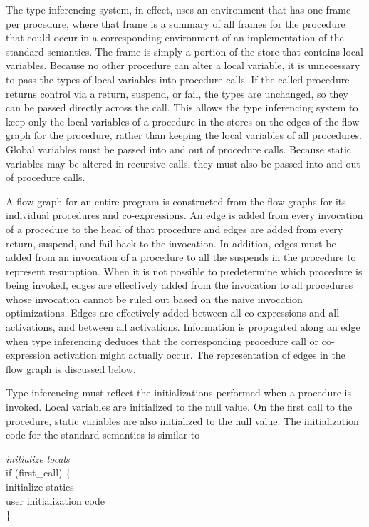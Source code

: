 The type inferencing system, in effect, uses an environment that has
one frame per procedure, where that frame is a summary of all frames
for the procedure that could occur in a corresponding environment of
an implementation of the standard semantics. The frame is simply a
portion of the store that contains local variables. Because no other
procedure can alter a local variable, it is unnecessary to pass the
types of local variables into procedure calls. If the called procedure
returns control via a return, suspend, or fail, the types are
unchanged, so they can be passed directly across the call. This allows
the type inferencing system to keep only the local variables of a
procedure in the stores on the edges of the flow graph for the
procedure, rather than keeping the local variables of all procedures.
Global variables must be passed into and out of procedure
calls. Because static variables may be altered in recursive calls,
they must also be passed into and out of procedure calls.

A flow graph for an entire program is constructed from the flow graphs
for its individual procedures and co-expressions.  An edge is added
from every invocation of a procedure to the head of that procedure and
edges are added from every return, suspend, and fail back to the
invocation. In addition, edges must be added from an invocation of a
procedure to all the suspends in the procedure to represent
resumption. When it is not possible to predetermine which procedure is
being invoked, edges are effectively added from the invocation to all
procedures whose invocation cannot be ruled out based on the naive
invocation optimizations. Edges are effectively added between all
co-expressions and all activations, and between all
activations. Information is propagated along an edge when type
inferencing deduces that the corresponding procedure call or
co-expression activation might actually occur. The representation of
edges in the flow graph is discussed below.

Type inferencing must reflect the initializations performed when a
procedure is invoked. Local variables are initialized to the null
value. On the first call to the procedure, static variables are also
initialized to the null value. The initialization code for the
standard semantics is similar to

\goodbreak
\begin{iconcode}
\>\textit{initialize locals}\\
\>if (first\_call) \{\\
\>\>initialize statics\\
\>\>user initialization code\\
\>\}\\
\end{iconcode}

